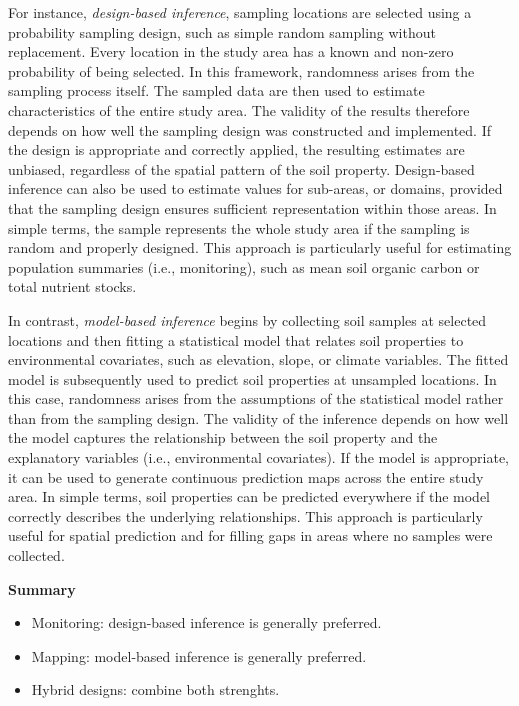 \documentclass[
  10pt,
  b5paper,
  oneside]{book}
\begin{document}
For instance, \emph{design-based inference}, sampling locations are selected using a probability sampling design, such as simple random sampling without replacement. Every location in the study area has a known and non-zero probability of being selected. In this framework, randomness arises from the sampling process itself. The sampled data are then used to estimate characteristics of the entire study area. The validity of the results therefore depends on how well the sampling design was constructed and implemented. If the design is appropriate and correctly applied, the resulting estimates are unbiased, regardless of the spatial pattern of the soil property. Design-based inference can also be used to estimate values for sub-areas, or domains, provided that the sampling design ensures sufficient representation within those areas. In simple terms, the sample represents the whole study area if the sampling is random and properly designed. This approach is particularly useful for estimating population summaries (i.e., monitoring), such as mean soil organic carbon or total nutrient stocks.

In contrast, \emph{model-based inference} begins by collecting soil samples at selected locations and then fitting a statistical model that relates soil properties to environmental covariates, such as elevation, slope, or climate variables. The fitted model is subsequently used to predict soil properties at unsampled locations. In this case, randomness arises from the assumptions of the statistical model rather than from the sampling design. The validity of the inference depends on how well the model captures the relationship between the soil property and the explanatory variables (i.e., environmental covariates). If the model is appropriate, it can be used to generate continuous prediction maps across the entire study area. In simple terms, soil properties can be predicted everywhere if the model correctly describes the underlying relationships. This approach is particularly useful for spatial prediction and for filling gaps in areas where no samples were collected.

\textbf{Summary}

\begin{itemize}
\item
  Monitoring: design-based inference is generally preferred.
\item
  Mapping: model-based inference is generally preferred.
\item
  Hybrid designs: combine both strenghts.
\end{itemize}
\end{document}
